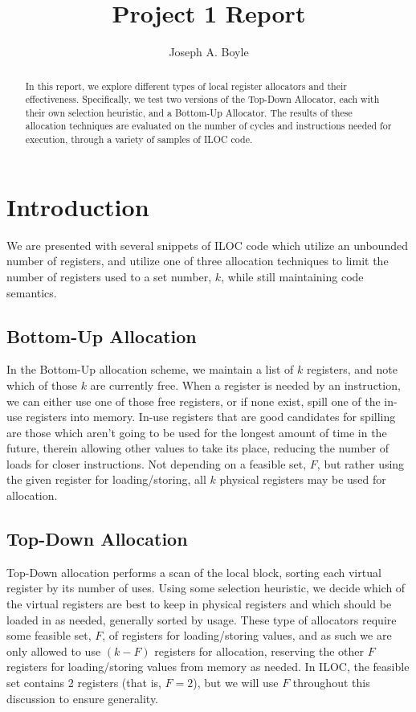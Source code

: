 \documentclass[answers]{exam}
\date{\duedate}
\title{Project 1 Report}
\author{Joseph A. Boyle}
\begin{document}
\maketitle
\begin{abstract}
In this report, we explore different types of local register allocators and their effectiveness. Specifically, we test two versions of the Top-Down Allocator, each with their own selection heuristic, and a Bottom-Up Allocator. The results of these allocation techniques are evaluated on the number of cycles and instructions needed for execution, through a variety of samples of ILOC code.
\end{abstract}

\section{Introduction}
	We are presented with several snippets of ILOC code which utilize an unbounded number of registers, and utilize one of three allocation techniques to limit the number of registers used to a set number, $k$, while still maintaining code semantics. 
	\subsection{Bottom-Up Allocation}
		In the Bottom-Up allocation scheme, we maintain a list of $k$ registers, and note which of those $k$ are currently free. When a register is needed by an instruction, we can either use one of those free registers, or if none exist, spill one of the in-use registers into memory. In-use registers that are good candidates for spilling are those which aren't going to be used for the longest amount of time in the future, therein allowing other values to take its place, reducing the number of loads for closer instructions. Not depending on a feasible set, $F$, but rather using the given register for loading/storing, all $k$ physical registers may be used for allocation.
		
	\subsection{Top-Down Allocation}
		Top-Down allocation performs a scan of the local block, sorting each virtual register by its number of uses. Using some selection heuristic, we decide which of the virtual registers are best to keep in physical registers and which should be loaded in as needed, generally sorted by usage. These type of allocators require some feasible set, $F$, of registers for loading/storing values, and as such we are only allowed to use $(k-F)$ registers for allocation, reserving the other $F$ registers for loading/storing values from memory as needed. In ILOC, the feasible set contains 2 registers (that is, $F = 2$), but we will use $F$ throughout this discussion to ensure generality.
		
\end{document}

